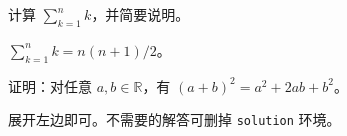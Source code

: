 \begin{problem}[10 分]
  计算 $\sum_{k=1}^{n} k$，并简要说明。
\end{problem}

\begin{solution}
  $\sum_{k=1}^{n} k = n(n+1)/2$。
\end{solution}

\begin{problem}[15 分]
  证明：对任意 $a,b\in\mathbb{R}$，有 $(a+b)^2 = a^2+2ab+b^2$。
\end{problem}

\begin{solution}
  展开左边即可。不需要的解答可删掉 \texttt{solution} 环境。
\end{solution}
